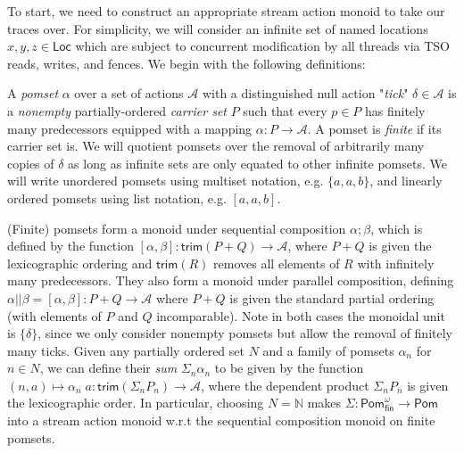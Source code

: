 \documentclass[acmsmall,screen,review]{acmart}
\newcommand{\mc}[1]{\ensuremath{\mathcal{#1}}}
\newcommand{\ms}[1]{\ensuremath{\mathsf{#1}}}
\newcommand{\nats}{\mathbb{N}}
\begin{document}
To start, we need to construct an appropriate stream action monoid to take our traces over. For
simplicity, we will consider an infinite set of named locations \(x, y, z \in \ms{Loc}\) which are
subject to concurrent modification by all threads via TSO reads, writes, and fences. We begin with
the following definitions:
\begin{definition}[Pomset] 
  A \emph{pomset} \(\alpha\) over a set of actions \(\mc{A}\) with a distinguished null action
  "\emph{tick}" \(\delta \in \mc{A}\) is a \textit{nonempty} partially-ordered \emph{carrier set}
  \(P\) such that every \(p \in P\) has finitely many predecessors equipped with a mapping \(\alpha:
  P \to \mc{A}\). A pomset is \emph{finite} if its carrier set is. We will quotient pomsets over the
  removal of arbitrarily many copies of $\delta$ as long as infinite sets are only equated to other
  infinite pomsets. We will write unordered pomsets using multiset notation, e.g. \(\{a, a, b\}\),
  and linearly ordered pomsets using list notation, e.g. \([a, a, b]\).
\end{definition}
(Finite) pomsets form a monoid under sequential composition \(\alpha;\beta\), which is defined by
the function \([\alpha, \beta]: \ms{trim}(P + Q) \to \mc{A}\), where \(P + Q\) is given the
lexicographic ordering and \(\ms{trim}(R)\) removes all elements of \(R\) with infinitely many
predecessors. They also form a monoid under parallel composition, defining \(\alpha || \beta =
[\alpha, \beta]: P + Q \to \mc{A}\) where \(P + Q\) is given the standard partial ordering (with
elements of \(P\) and \(Q\) incomparable). Note in both cases the monoidal unit is \(\{\delta\}\),
since we only consider nonempty pomsets but allow the removal of finitely many ticks. Given any
partially ordered set \(N\) and a family of pomsets \(\alpha_n\) for \(n \in N\), we can define
their \textit{sum} \(\Sigma_n\alpha_n\) to be given by the function \((n, a) \mapsto \alpha_n\;a:
\ms{trim}(\Sigma_nP_n) \to \mc{A}\), where the dependent product \(\Sigma_nP_n\) is given the
lexicographic order. In particular, choosing \(N = \nats\) makes \(\Sigma:
\ms{Pom}_{\ms{fin}}^\omega \to \ms{Pom}\) into a stream action monoid w.r.t the sequential
composition monoid on finite pomsets. 
\end{document}
